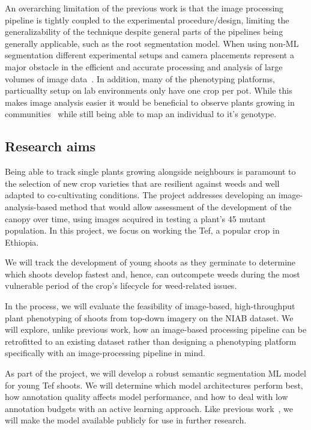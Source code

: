 An overarching limitation of the previous work is that the image processing pipeline is tightly coupled to the experimental procedure/design, limiting the generalizability of the technique despite general parts of the pipelines being generally applicable, such as the root segmentation model.
When using non-ML segmentation different experimental setups and camera placements represent a major obstacle in the efficient and accurate processing and analysis of large volumes of image data~\cite{minerviniImageAnalysisNew2015}.
In addition, many of the phenotyping platforms, particuallty setup on lab environments only have one crop per pot.
While this makes image analysis easier it would be beneficial to observe plants growing in communities~\cite{finchWheatRootLength2017} while still being able to map an individual to it's genotype.

\subsection{Research aims}\label{subsec:research-aims} %

Being able to track single plants growing alongside neighbours is paramount to the selection of new crop varieties that are resilient against weeds and well adapted to co-cultivating conditions. The project addresses developing an image-analysis-based method that would allow assessment of the development of the canopy over time, using images acquired in testing a plant's 45 mutant population. In this project, we focus on working the Tef, a popular crop in Ethiopia.

We will track the development of young shoots as they germinate to determine which shoots develop fastest and, hence, can outcompete weeds during the most vulnerable period of the crop's lifecycle for weed-related issues.

In the process, we will evaluate the feasibility of image-based, high-throughput plant phenotyping of shoots from top-down imagery on the NIAB dataset. We will explore, unlike previous work, how an image-based processing pipeline can be retrofitted to an existing dataset rather than designing a phenotyping platform specifically with an image-processing pipeline in mind.

As part of the project, we will develop a robust semantic segmentation ML model for young Tef shoots. We will determine which model architectures perform best, how annotation quality affects model performance, and how to deal with low annotation budgets with an active learning approach. Like previous work~\cite{smithOotAinterDeep2022, narisettiDeepLearningBased2022}, we will make the model available publicly for use in further research.

